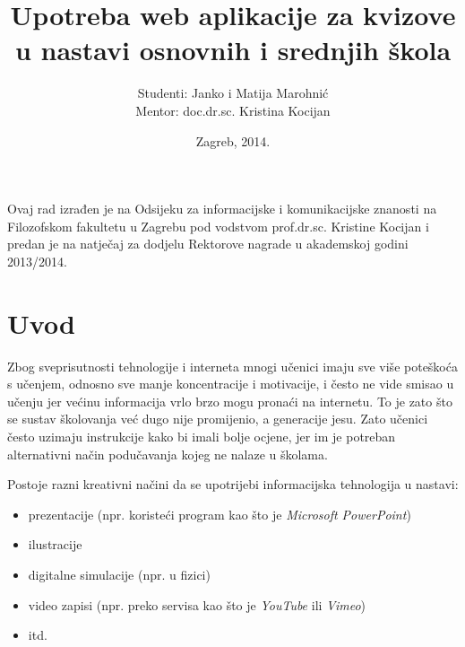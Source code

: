 \documentclass{scrreprt}
\begin{document}
\titlehead{}
\title{Upotreba web aplikacije za kvizove u nastavi osnovnih i srednjih škola}
\author{Studenti: Janko i Matija Marohnić\\Mentor: doc.dr.sc. Kristina Kocijan}
\date{Zagreb, 2014.}

\maketitle

\pagebreak

Ovaj rad izrađen je na Odsijeku za informacijske i komunikacijske znanosti na
Filozofskom fakultetu u Zagrebu pod vodstvom prof.dr.sc. Kristine Kocijan i
predan je na natječaj za dodjelu Rektorove nagrade u akademskoj godini
2013/2014.

\pagebreak

\tableofcontents

\chapter{Uvod}

Zbog sveprisutnosti tehnologije i interneta mnogi učenici imaju sve više
poteškoća s učenjem, odnosno sve manje koncentracije i motivacije, i često ne
vide smisao u učenju jer većinu informacija vrlo brzo mogu pronaći na internetu.
To je zato što se sustav školovanja već dugo nije promijenio, a generacije
jesu.\cite{perisic13} Zato učenici često uzimaju instrukcije kako bi imali bolje
ocjene, jer im je potreban alternativni način podučavanja kojeg ne nalaze u
školama.\cite{kustura09}

Postoje razni kreativni načini da se upotrijebi informacijska tehnologija u
nastavi:

\begin{itemize}
  \item prezentacije (npr. koristeći program kao što je \emph{Microsoft
    PowerPoint})
  \item ilustracije
  \item digitalne simulacije (npr. u fizici)
  \item video zapisi (npr. preko servisa kao što je \emph{YouTube} ili
    \emph{Vimeo})
  \item itd.
\end{itemize}
\end{document}
